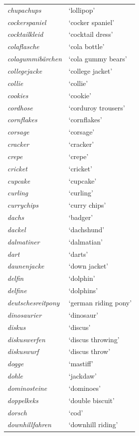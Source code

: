 \begin{longtable}{ll}
\textit{chupachups} & `lollipop' \\
\textit{cockerspaniel} & `cocker spaniel' \\
\textit{cocktailkleid} & `cocktail dress' \\
\textit{colaflasche} & `cola bottle' \\
\textit{colagummibärchen} & `cola gummy bears' \\
\textit{collegejacke} & `college jacket' \\
\textit{collie} & `collie' \\
\textit{cookies} & `cookie' \\
\textit{cordhose} & `corduroy trousers' \\
\textit{cornflakes} & `cornflakes' \\
\textit{corsage} & `corsage' \\
\textit{cracker} & `cracker' \\
\textit{crepe} & `crepe' \\
\textit{cricket} & `cricket' \\
\textit{cupcake} & `cupcake' \\
\textit{curling} & `curling' \\
\textit{currychips} & `curry chips' \\
\textit{dachs} & `badger' \\
\textit{dackel} & `dachshund' \\
\textit{dalmatiner} & `dalmatian' \\
\textit{dart} & `darts' \\
\textit{daunenjacke} & `down jacket' \\
\textit{delfin} & `dolphin' \\
\textit{delfine} & `dolphins' \\
\textit{deutschesreitpony} & `german riding pony' \\
\textit{dinosaurier} & `dinosaur' \\
\textit{diskus} & `discus' \\
\textit{diskuswerfen} & `discus throwing' \\
\textit{diskuswurf} & `discus throw' \\
\textit{dogge} & `mastiff' \\
\textit{dohle} & `jackdaw' \\
\textit{dominosteine} & `dominoes' \\
\textit{doppelkeks} & `double biscuit' \\
\textit{dorsch} & `cod' \\
\textit{downhillfahren} & `downhill riding' \\

\end{longtable}
